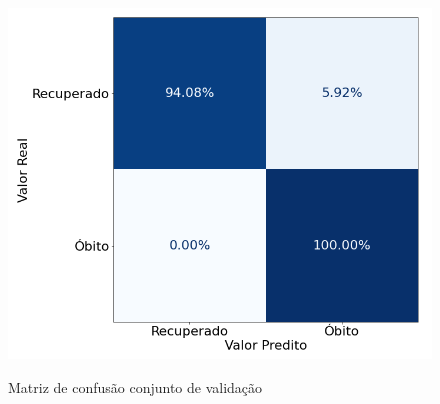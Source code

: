 \begin{figure}[H]
\caption{Matriz de confusão conjunto de validação}
\centering %
\includegraphics[width=12cm]{figuras/confusion_matrix.png}
\label{figura_confusion_matrix}
\end{figure}




